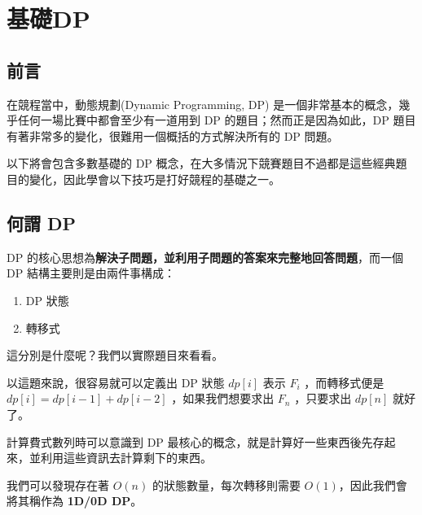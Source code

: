 \documentclass[main.tex]{subfiles}
\begin{document}
\chapter{基礎DP}

\section{前言}

    在競程當中，動態規劃(Dynamic Programming, DP) 是一個非常基本的概念，幾乎任何一場比賽中都會至少有一道用到 DP 的題目；然而正是因為如此，DP 題目有著非常多的變化，很難用一個概括的方式解決所有的 DP 問題。
    
    以下將會包含多數基礎的 DP 概念，在大多情況下競賽題目不過都是這些經典題目的變化，因此學會以下技巧是打好競程的基礎之一。

\section{何謂 DP}
    DP 的核心思想為\textbf{解決子問題，並利用子問題的答案來完整地回答問題}，而一個 DP 結構主要則是由兩件事構成：
    \begin{enumerate}
        \item DP 狀態
        \item 轉移式
    \end{enumerate}
    這分別是什麼呢？我們以實際題目來看看。
    
    以這題來說，很容易就可以定義出 DP 狀態 $dp[i]$ 表示 $F_i$ ，而轉移式便是 $dp[i] = dp[i-1] + dp[i-2]$ ，如果我們想要求出 $F_n$ ，只要求出 $dp[n]$ 就好了。
    
    計算費式數列時可以意識到 DP 最核心的概念，就是計算好一些東西後先存起來，並利用這些資訊去計算剩下的東西。
    
    我們可以發現存在著 $O(n)$ 的狀態數量，每次轉移則需要 $O(1)$，因此我們會將其稱作為 \textbf{1D/0D DP}。
\end{document}
